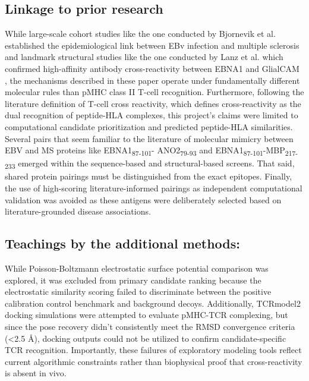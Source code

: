 \documentclass[11pt]{article}
\begin{document}
\subsection{Linkage to prior research}
While large-scale cohort studies like the one conducted by Bjornevik et al. established the epidemiological link between EBv infection and multiple sclerosis \cite{bjornevik} and landmark structural studies like the one conducted by Lanz et al. which confirmed high-affinity antibody cross-reactivity between EBNA1 and GlialCAM \cite{lanz}, the mechanisms described in these paper operate under fundamentally different molecular rules than pMHC class II T-cell recognition. Furthermore, following the literature definition of T-cell cross reactivity, which defines cross-reactivity as the dual recognition of peptide-HLA complexes, this project’s claims were limited to computational candidate prioritization and predicted peptide-HLA similarities. Several pairs that seem familiar to the literature of molecular mimicry between EBV and MS proteins like EBNA1\textsubscript{87-101}- ANO2\textsubscript{79-93} and EBNA1\textsubscript{87-101}-MBP\textsubscript{217-233} emerged within the sequence-based and structural-based screens. That said, shared protein pairings must be distinguished from the exact epitopes. \cite{thomas} Finally, the use of high-scoring literature-informed pairings as independent computational validation was avoided as these antigens were deliberately selected based on literature-grounded disease associations.

\subsection{Teachings by the additional methods:}
While Poisson-Boltzmann electrostatic surface potential comparison was explored, it was excluded from primary candidate ranking because the electrostatic similarity scoring failed to discriminate between the positive calibration control benchmark and background decoys. Additionally, TCRmodel2 docking simulations were attempted to evaluate pMHC-TCR complexing, but since the pose recovery didn’t consistently meet the RMSD convergence criteria (<2.5 Å), docking outputs could not be utilized to confirm candidate-specific TCR recognition. Importantly, these failures of exploratory modeling tools reflect current algorithmic constraints rather than biophysical proof that cross-reactivity is absent in vivo.
\end{document}
